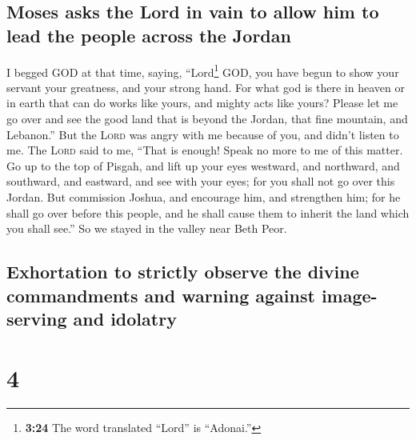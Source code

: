\hypertarget{moses-asks-the-lord-in-vain-to-allow-him-to-lead-the-people-across-the-jordan}{%
\subsection{Moses asks the Lord in vain to allow him to lead the people
across the
Jordan}\label{moses-asks-the-lord-in-vain-to-allow-him-to-lead-the-people-across-the-jordan}}

 I begged GOD at that time, saying, 
``Lord\footnote{\textbf{3:24} The word translated ``Lord'' is
  ``Adonai.''} GOD, you have begun to show your servant your greatness,
and your strong hand. For what god is there in heaven or in earth that
can do works like yours, and mighty acts like yours? 
Please let me go over and see the good land that is beyond the Jordan,
that fine mountain, and Lebanon.''  But the \textsc{Lord}
was angry with me because of you, and didn't listen to me. The
\textsc{Lord} said to me, ``That is enough! Speak no more to me of this
matter.  Go up to the top of Pisgah, and lift up your
eyes westward, and northward, and southward, and eastward, and see with
your eyes; for you shall not go over this Jordan.  But
commission Joshua, and encourage him, and strengthen him; for he shall
go over before this people, and he shall cause them to inherit the land
which you shall see.''  So we stayed in the valley near
Beth Peor.

\hypertarget{exhortation-to-strictly-observe-the-divine-commandments-and-warning-against-image-serving-and-idolatry}{%
\subsection{Exhortation to strictly observe the divine commandments and
warning against image-serving and
idolatry}\label{exhortation-to-strictly-observe-the-divine-commandments-and-warning-against-image-serving-and-idolatry}}

\hypertarget{section-3}{%
\section{4}\label{section-3}}

